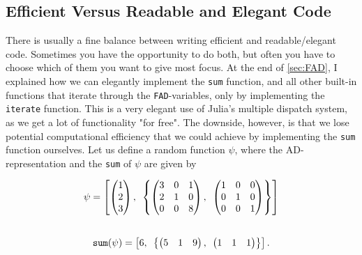 \subsection{Efficient Versus Readable and Elegant Code}
There is usually a fine balance between writing efficient and readable/elegant code. Sometimes you have the opportunity to do both, but often you have to choose which of them you want to give most focus. At the end of \autoref{sec:FAD}, I explained how we can elegantly implement the \texttt{sum} function, and all other built-in functions that iterate through the \texttt{FAD}-variables, only by implementing the \texttt{iterate} function. This is a very elegant use of Julia's multiple dispatch system, as we get a lot of functionality "for free". The downside, however, is that we lose potential computational efficiency that we could achieve by implementing the \texttt{sum} function ourselves. Let us define a random function $\psi$, where the AD-representation and the \texttt{sum} of $\psi$ are given by
\begin{multicols}{2}
    \noindent
    \begin{align*}
        \textbf{$\psi$} = \left[\begin{pmatrix}1\\2\\3
        \end{pmatrix},\hspace{0.5em}\left\{
        \begin{pmatrix}
        3&0&1\\
        2&1&0\\
        0&0&8\end{pmatrix},\hspace{0.5em}
        \begin{pmatrix}
        1&0&0\\
        0&1&0\\
        0&0&1\end{pmatrix}\right\}
        \right]
    \end{align*}
    \begin{align*}
    \\
        \texttt{sum}(\textbf{$\psi$}) = \left[6,\hspace{0.5em}
        \left\{
        \begin{pmatrix}
        5&1&9\\
        \end{pmatrix},\hspace{0.5em}
        \begin{pmatrix}
        1&1&1\\
        \end{pmatrix}\right\}
        \right].
    \end{align*}
\end{multicols}
